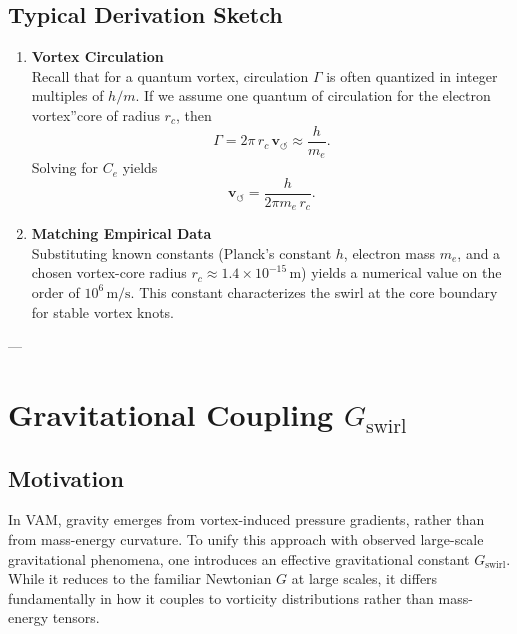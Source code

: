 \documentclass[a4paper,12pt]{article}
\begin{document}
\subsection{Typical Derivation Sketch}
\begin{enumerate}
    \item \textbf{Vortex Circulation} \\
    Recall that for a quantum vortex, circulation \(\Gamma\) is often quantized in integer multiples of \(h/m\). If we assume one quantum of circulation for the \grqq electron vortex\textquotedblright core of radius \(r_c\), then
    \[
        \Gamma = 2 \pi \,r_c \,\mathbf{v}_{\scriptscriptstyle\boldsymbol{\circlearrowleft}} \approx \frac{h}{m_e}.
    \]
    Solving for \(C_e\) yields
    \[
        \mathbf{v}_{\scriptscriptstyle\boldsymbol{\circlearrowleft}}  =  \frac{h}{2 \pi m_e \,r_c}.
    \]

    \item \textbf{Matching Empirical Data} \\
    Substituting known constants (Planck's constant \(h\), electron mass \(m_e\), and a chosen vortex-core radius \(r_c\approx 1.4\times 10^{-15}\,\mathrm{m}\)) yields a numerical value on the order of \(10^6\,\mathrm{m/s}\). This constant characterizes the swirl at the core boundary for stable vortex knots.
\end{enumerate}

---

\section{Gravitational Coupling \(G_\text{swirl}\)}

\subsection{Motivation}
In VAM, gravity emerges from vortex-induced pressure gradients, rather than from mass-energy curvature. To unify this approach with observed large-scale gravitational phenomena, one introduces an effective gravitational constant \(G_\text{swirl}\). While it reduces to the familiar Newtonian \(G\) at large scales, it differs fundamentally in how it couples to vorticity distributions rather than mass-energy tensors.
\end{document}
